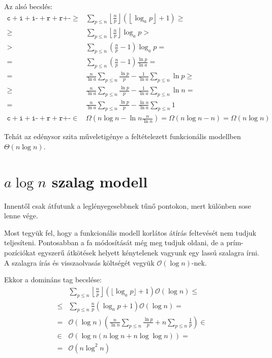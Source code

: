 \documentclass{article}
\begin{document}
Az alsó becslés:
\begin{align*}
\texttt{c}+\texttt{i}+\texttt{i-}+\texttt{r}+\texttt{r+-}
\ge& \sum_{p \le n} \left\lfloor \frac{n}{p} \right\rfloor \left( \left\lfloor \log_{a}{p} \right\rfloor + 1 \right) \ge \\
\ge& \sum_{p \le n} \left\lfloor \frac{n}{p} \right\rfloor \log_{a}{p} > \\
>& \sum_{p \le n} \left( \frac{n}{p} - 1 \right) \log_{a}{p} = \\
=& \sum_{p \le n} \left( \frac{n}{p} - 1 \right) \frac{\ln{p}}{\ln{a}} = \\
=& \frac{n}{\ln{a}} \sum_{p \le n} \frac{\ln{p}}{p} - \frac{1}{\ln{a}} \sum_{p \le n} \ln{p} \ge \\
\ge& \frac{n}{\ln{a}} \sum_{p \le n} \frac{\ln{p}}{p} - \frac{1}{\ln{a}} \sum_{p \le n} \ln{n} = \\
=& \frac{n}{\ln{a}} \sum_{p \le n} \frac{\ln{p}}{p} - \frac{\ln{n}}{\ln{a}} \sum_{p \le n} 1 \\
\texttt{c}+\texttt{i}+\texttt{i-}+\texttt{r}+\texttt{r+-}
\in& \Omega(n \log{n} - \ln{n} \frac{n}{\ln{n}}) = \Omega(n \log{n} - n) = \Omega(n \log{n})
\end{align*}

Tehát az edénysor szita műveletigénye a feltételezett funkcionális modellben $\Theta(n \log{n})$.

\section{$a\log{}{n}$ szalag modell}

Innentől csak átfutunk a leglényegesebbnek tűnő pontokon, mert különben sose lenne vége.

Most tegyük fel, hogy a funkcionális modell korlátos átírás feltevését nem tudjuk teljesíteni.
Pontosabban a fa módosítását még meg tudjuk oldani, de a prím-pozíciókat egyszerű átkötések helyett kénytelenek vagyunk egy lassú szalagra írni.
A szalagra írás és visszaolvasás költségét vegyük $\mathcal{O}(\log{n})$-nek.

Ekkor a domináns tag becslése:
\begin{align*}
& \sum_{p \le n} \left\lfloor \frac{n}{p} \right\rfloor ( \lfloor \log_{a}{p} \rfloor + 1 ) \mathcal{O}(\log{n}) \le \\
\le& \sum_{p \le n} \frac{n}{p} ( \log_{a}{p} + 1 ) \mathcal{O}(\log{n}) = \\
=& \mathcal{O}(\log{n}) \left( \frac{n}{\ln{n}} \sum_{p \le n} \frac{\ln{p}}{p} + n \sum_{p \le n} \frac{1}{p} \right) \in \\
\in& \mathcal{O}(\log{n}(n \log{n} + n \log{\log{n}})) = \\
= & \mathcal{O}(n \log^{2}{n})
\end{align*}
\end{document}
